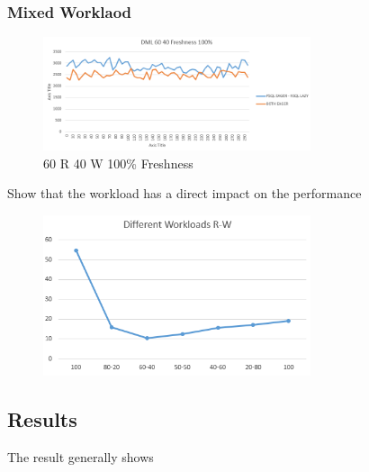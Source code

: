 \subsubsection{Mixed Worklaod} 

\begin{figure}[t] 
    \centering 
    \includegraphics[width=0.7\textwidth]{Figures/60_40_fresh_100.PNG}
    \caption{60 R 40 W 100\% Freshness}
    \label{fig:}
\end{figure}




Show that the workload has a direct impact on the performance
\begin{figure}[t] 
    \centering 
    \includegraphics[width=0.7\textwidth]{Figures/different_ workloads.PNG}
    \caption{}
    \label{fig:}
\end{figure}






\subsection{Results}
\label{sec:discussion}

The result generally shows




